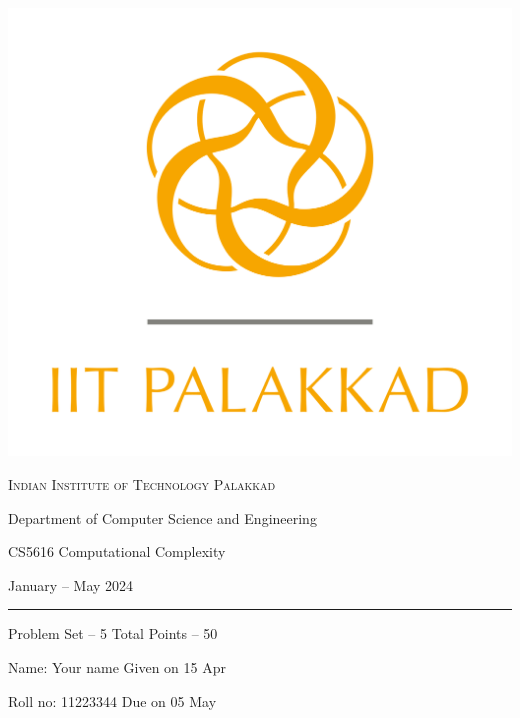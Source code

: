 \documentclass[12pt, a4paper,answers]{exam}
\begin{document}
	\noindent
	\begin{minipage}[l]{0.1\textwidth}
		\noindent
		\includegraphics[width=2.4\textwidth]{iitpkd}
	\end{minipage}
	\hfill
	\begin{minipage}[c]{0.8\textwidth}
		\begin{center}
			{\large \textsc{\textcolor{iitpkdcolor}{Indian Institute of Technology Palakkad}} \par
				\small	Department of Computer Science and Engineering	\par
				\large	CS5616 Computational Complexity \par 
				\small January -- May 2024}
		\end{center}
	\end{minipage}
	\par
\vspace{2mm}
\hrule
\vspace{2mm}
\begin{minipage}{0.9\textwidth} 
	\textsf{Problem Set} -- 5  \hfill  \textsf{Total Points} -- 50
	
	{\small \textsf{Name}: Your name    \hfill \small \textsf{Given on} 15 Apr}
	
	{\small \textsf{Roll no}: 11223344  \hfill \small \textsf{Due on} 05 May }
\end{minipage}
	\vspace{0.2in}
\noindent
\end{document}
